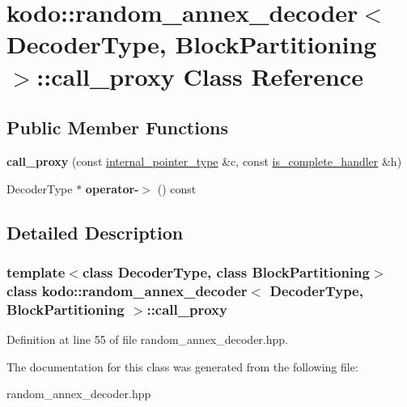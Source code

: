 \hypertarget{classkodo_1_1random__annex__decoder_1_1call__proxy}{\section{kodo\-:\-:random\-\_\-annex\-\_\-decoder$<$ Decoder\-Type, Block\-Partitioning $>$\-:\-:call\-\_\-proxy Class Reference}
\label{classkodo_1_1random__annex__decoder_1_1call__proxy}
}
\subsection*{Public Member Functions}
\begin{DoxyCompactItemize}
\item 
\hypertarget{classkodo_1_1random__annex__decoder_1_1call__proxy_ae020359f73b6b79693cc50390ea1fc5f}{{\bfseries call\-\_\-proxy} (const \hyperlink{classkodo_1_1random__annex__decoder_adbc8e1eb9e3b31cd1461d375cb3e6b2f}{internal\-\_\-pointer\-\_\-type} \&c, const \hyperlink{classkodo_1_1random__annex__decoder_ab4721acd76dbc223b2e46966b543913a}{is\-\_\-complete\-\_\-handler} \&h)}\label{classkodo_1_1random__annex__decoder_1_1call__proxy_ae020359f73b6b79693cc50390ea1fc5f}

\item 
\hypertarget{classkodo_1_1random__annex__decoder_1_1call__proxy_a49737cfe22f92dd97e21033686889c79}{Decoder\-Type $\ast$ {\bfseries operator-\/$>$} () const }\label{classkodo_1_1random__annex__decoder_1_1call__proxy_a49737cfe22f92dd97e21033686889c79}

\end{DoxyCompactItemize}


\subsection{Detailed Description}
\subsubsection*{template$<$class Decoder\-Type, class Block\-Partitioning$>$class kodo\-::random\-\_\-annex\-\_\-decoder$<$ Decoder\-Type, Block\-Partitioning $>$\-::call\-\_\-proxy}



Definition at line 55 of file random\-\_\-annex\-\_\-decoder.\-hpp.



The documentation for this class was generated from the following file\-:\begin{DoxyCompactItemize}
\item 
random\-\_\-annex\-\_\-decoder.\-hpp\end{DoxyCompactItemize}
